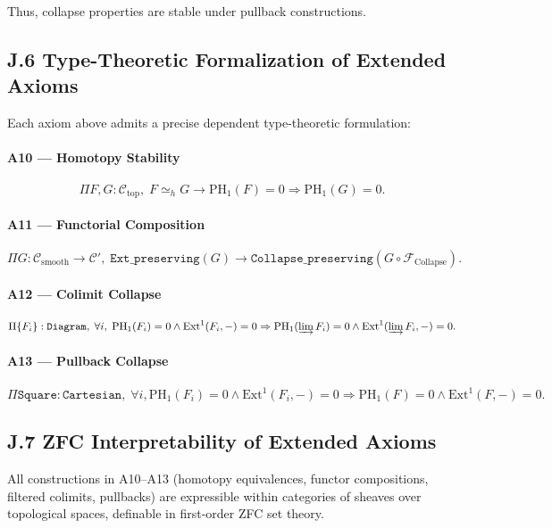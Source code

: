 \documentclass[11pt]{article}
\begin{document}
Thus, collapse properties are stable under pullback constructions.

\subsection*{J.6 Type-Theoretic Formalization of Extended Axioms}

Each axiom above admits a precise dependent type-theoretic formulation:

\paragraph{A10 — Homotopy Stability}
\[
\Pi F, G : \mathcal{C}_{\mathrm{top}}, \; F \simeq_h G \to \mathrm{PH}_1(F) = 0 \Rightarrow \mathrm{PH}_1(G) = 0.
\]

\paragraph{A11 — Functorial Composition}
\[
\Pi G : \mathcal{C}_{\mathrm{smooth}} \to \mathcal{C}', \;
\texttt{Ext\_preserving}(G) \to \texttt{Collapse\_preserving}(G \circ \mathcal{F}_{\mathrm{Collapse}}).
\]

\paragraph{A12 — Colimit Collapse}
\[
\Pi \{ F_i \} : \texttt{Diagram}, \;
\forall i, \; \mathrm{PH}_1(F_i) = 0 \wedge \mathrm{Ext}^1(F_i, -) = 0 \Rightarrow \mathrm{PH}_1(\varinjlim F_i) = 0 \wedge \mathrm{Ext}^1(\varinjlim F_i, -) = 0.
\]

\paragraph{A13 — Pullback Collapse}
\[
\Pi \texttt{Square} : \texttt{Cartesian}, \;
\forall i, \mathrm{PH}_1(F_i) = 0 \wedge \mathrm{Ext}^1(F_i, -) = 0 \Rightarrow \mathrm{PH}_1(F) = 0 \wedge \mathrm{Ext}^1(F, -) = 0.
\]

\subsection*{J.7 ZFC Interpretability of Extended Axioms}

All constructions in A10–A13 (homotopy equivalences, functor compositions, filtered colimits, pullbacks) are expressible within categories of sheaves over topological spaces, definable in first-order ZFC set theory.
\end{document}
